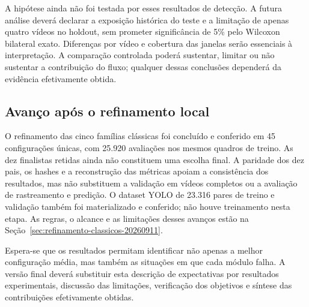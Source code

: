 A hipótese ainda não foi testada por esses resultados de detecção. A futura análise deverá declarar a exposição histórica do teste e a limitação de apenas quatro vídeos no holdout, sem prometer significância de 5\% pelo Wilcoxon bilateral exato. Diferenças por vídeo e cobertura das janelas serão essenciais à interpretação. A comparação controlada poderá sustentar, limitar ou não sustentar a contribuição do fluxo; qualquer dessas conclusões dependerá da evidência efetivamente obtida.


\subsection{Avanço após o refinamento local}

O refinamento das cinco famílias clássicas foi concluído e conferido em 45 configurações únicas, com 25.920 avaliações nos mesmos quadros de treino. As dez finalistas retidas ainda não constituem uma escolha final. A paridade dos dez pais, os hashes e a reconstrução das métricas apoiam a consistência dos resultados, mas não substituem a validação em vídeos completos ou a avaliação de rastreamento e predição. O dataset YOLO de 23.316 pares de treino e validação também foi materializado e conferido; não houve treinamento nesta etapa. As regras, o alcance e as limitações desses avanços estão na Seção~\ref{sec:refinamento-classicos-20260911}.

Espera-se que os resultados permitam identificar não apenas a melhor configuração média, mas também as situações em que cada módulo falha. A versão final deverá substituir esta descrição de expectativas por resultados experimentais, discussão das limitações, verificação dos objetivos e síntese das contribuições efetivamente obtidas.
